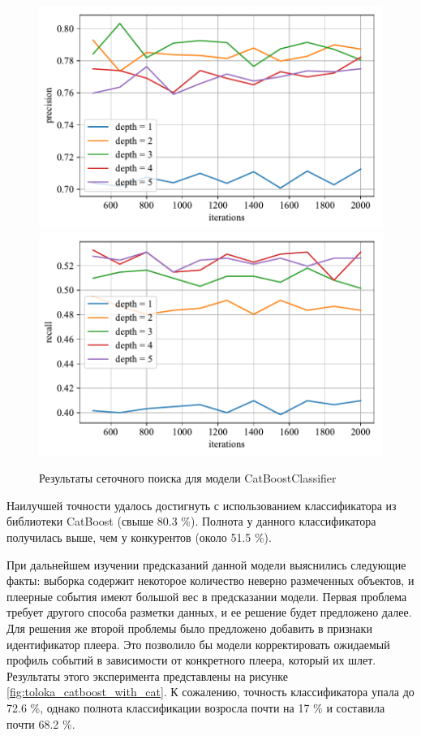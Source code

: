 \begin{figure}
    \centering
    \includegraphics{./images/toloka_catboost_precision.pdf}
    \includegraphics{./images/toloka_catboost_recall.pdf}
    \caption{Результаты сеточного поиска для модели CatBoostClassifier}
    \label{fig:toloka_catboost}
\end{figure}

Наилучшей точности удалось достигнуть с использованием классификатора из библиотеки CatBoost (свыше 80.3 \%). Полнота у данного классификатора получилась выше, чем у конкурентов (около 51.5 \%).

При дальнейшем изучении предсказаний данной модели выяснились следующие факты: выборка содержит некоторое количество неверно размеченных объектов, и плеерные события имеют большой вес в предсказании модели. Первая проблема требует другого способа разметки данных, и ее решение будет предложено далее. Для решения же второй проблемы было предложено добавить в признаки идентификатор плеера. Это позволило бы модели корректировать ожидаемый профиль событий в зависимости от конкретного плеера, который их шлет. Результаты этого эксперимента представлены на рисунке \ref{fig:toloka_catboost_with_cat}. К сожалению, точность классификатора упала до 72.6 \%, однако полнота классификации возросла почти на 17 \% и составила почти 68.2 \%.

